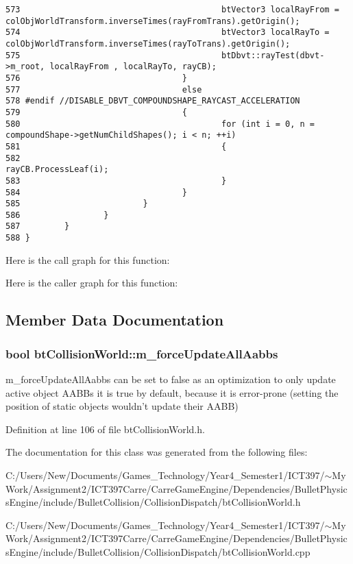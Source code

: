 \begin{Code}
\begin{verbatim}
573                                         btVector3 localRayFrom = colObjWorldTransform.inverseTimes(rayFromTrans).getOrigin();
574                                         btVector3 localRayTo = colObjWorldTransform.inverseTimes(rayToTrans).getOrigin();
575                                         btDbvt::rayTest(dbvt->m_root, localRayFrom , localRayTo, rayCB);
576                                 }
577                                 else
578 #endif //DISABLE_DBVT_COMPOUNDSHAPE_RAYCAST_ACCELERATION
579                                 {
580                                         for (int i = 0, n = compoundShape->getNumChildShapes(); i < n; ++i)
581                                         {
582                                                 rayCB.ProcessLeaf(i);
583                                         }       
584                                 }
585                         }
586                 }
587         }
588 }
\end{verbatim}
\end{Code}




Here is the call graph for this function:

Here is the caller graph for this function:

\subsection{Member Data Documentation}
\hypertarget{classbt_collision_world_91b110fc2501b965cdcaa2a6e1d89999}{
\subsubsection[m\_\-forceUpdateAllAabbs]{\setlength{\rightskip}{0pt plus 5cm}bool {\bf btCollisionWorld::m\_\-forceUpdateAllAabbs}}}
\label{classbt_collision_world_91b110fc2501b965cdcaa2a6e1d89999}


m\_\-forceUpdateAllAabbs can be set to false as an optimization to only update active object AABBs it is true by default, because it is error-prone (setting the position of static objects wouldn't update their AABB) 

Definition at line 106 of file btCollisionWorld.h.

The documentation for this class was generated from the following files:\begin{CompactItemize}
\item 
C:/Users/New/Documents/Games\_\-Technology/Year4\_\-Semester1/ICT397/$\sim$My Work/Assignment2/ICT397Carre/CarreGameEngine/Dependencies/BulletPhysicsEngine/include/BulletCollision/CollisionDispatch/btCollisionWorld.h\item 
C:/Users/New/Documents/Games\_\-Technology/Year4\_\-Semester1/ICT397/$\sim$My Work/Assignment2/ICT397Carre/CarreGameEngine/Dependencies/BulletPhysicsEngine/include/BulletCollision/CollisionDispatch/btCollisionWorld.cpp\end{CompactItemize}

